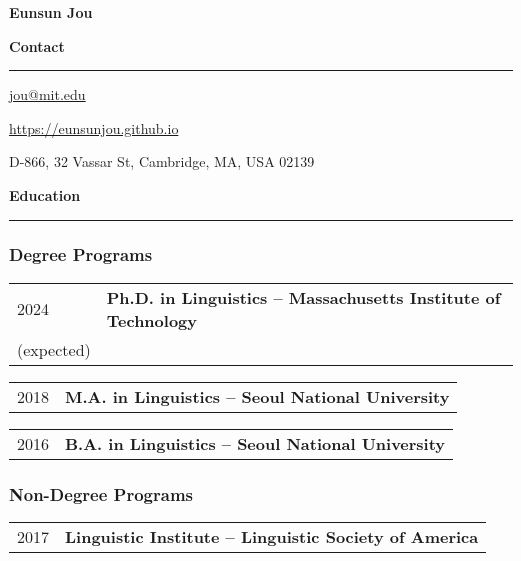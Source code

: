 \documentclass[12pt]{article}
\newcommand{\sect}[1]{{\fontsize{17}{30}\selectfont \textbf{#1}} {\vspace{0.1cm}} \hrule {\vspace{0.3cm}}}
\begin{document}
\begin{center}
{\Large \textbf{Eunsun Jou}}
\end{center}

\thispagestyle{firstpage}

\sect{Contact}

\href{mailto:jou@mit.edu}{jou@mit.edu}

\href{https://eunsunjou.github.io}{https://eunsunjou.github.io}

D-866, 32 Vassar St, Cambridge, MA, USA 02139

\vspace{1cm}

\sect{Education}

\subsubsection*{Degree Programs}
\begin{tabular}{p{}|p{}}
    {2024}&{\textbf{Ph.D. in Linguistics -- Massachusetts Institute of Technology}}\\
    {(expected)}&{}\\
\end{tabular}

\vspace{0.2cm}

\begin{tabular}{p{}|p{}}
	{2018}&{\textbf{M.A. in Linguistics -- Seoul National University}}\\
 \end{tabular}

\vspace{0.2cm}

\begin{tabular}{p{}|p{}}
   {2016}&{\textbf{B.A. in Linguistics -- Seoul National University}}\\
\end{tabular}

\subsubsection*{Non-Degree Programs}
\begin{tabular}{p{}|p{}}
	{2017}&{\textbf{Linguistic Institute -- Linguistic Society of America}}\\
\end{tabular}
\end{document}

